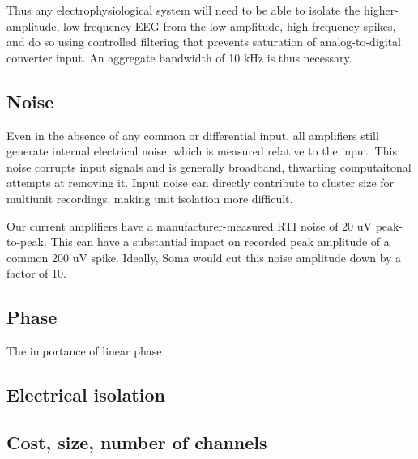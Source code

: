 Thus any electrophysiological system will need to be able to isolate
the higher-amplitude, low-frequency EEG from the low-amplitude,
high-frequency spikes, and do so using controlled filtering that
prevents saturation of analog-to-digital converter input. An aggregate
bandwidth of 10 kHz is thus necessary.

\subsection{Noise}
Even in the absence of any common or differential input, all
amplifiers still generate internal electrical noise, which is measured
relative to the input. This noise corrupts input signals and is
generally broadband, thwarting computaitonal attempts at removing it.
Input noise can directly contribute to cluster size for multiunit
recordings, making unit isolation more difficult.

Our current amplifiers have a manufacturer-measured RTI noise of 20 uV
peak-to-peak. This can have a substantial impact on recorded peak
amplitude of a common 200 uV spike. Ideally, Soma would cut this noise
amplitude down by a factor of 10.

\subsection{Phase}
 The importance of linear phase

\subsection{Electrical isolation} 

\subsection{Cost, size, number of channels}
